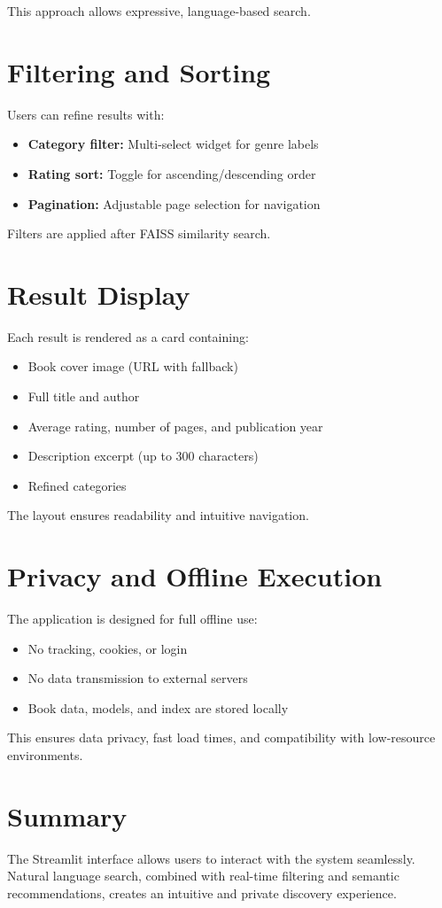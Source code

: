 This approach allows expressive, language-based search.

\section{Filtering and Sorting}
\label{sec:ui-filtering}

Users can refine results with:

\begin{itemize}
    \item \textbf{Category filter:} Multi-select widget for genre labels
    \item \textbf{Rating sort:} Toggle for ascending/descending order
    \item \textbf{Pagination:} Adjustable page selection for navigation
\end{itemize}

Filters are applied after FAISS similarity search.

\section{Result Display}
\label{sec:ui-display}

Each result is rendered as a card containing:

\begin{itemize}
    \item Book cover image (URL with fallback)
    \item Full title and author
    \item Average rating, number of pages, and publication year
    \item Description excerpt (up to 300 characters)
    \item Refined categories
\end{itemize}

The layout ensures readability and intuitive navigation.

\section{Privacy and Offline Execution}
\label{sec:ui-privacy}

The application is designed for full offline use:

\begin{itemize}
    \item No tracking, cookies, or login
    \item No data transmission to external servers
    \item Book data, models, and index are stored locally
\end{itemize}

This ensures data privacy, fast load times, and compatibility with low-resource environments.

\section{Summary}
\label{sec:ui-summary}

The Streamlit interface allows users to interact with the system seamlessly. 
Natural language search, combined with real-time filtering and semantic recommendations, creates an intuitive and private discovery experience.